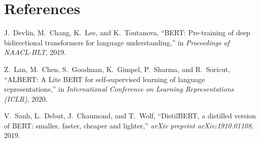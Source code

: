 \documentclass{article}
\begin{document}
\section*{References}

\begin{thebibliography}{1}

J.~Devlin, M.~Chang, K.~Lee, and K.~Toutanova, ``BERT: Pre-training of deep bidirectional transformers for language understanding,'' in \emph{Proceedings of NAACL-HLT}, 2019.

Z.~Lan, M.~Chen, S.~Goodman, K.~Gimpel, P.~Sharma, and R.~Soricut, ``ALBERT: A Lite BERT for self-supervised learning of language representations,'' in \emph{International Conference on Learning Representations (ICLR)}, 2020.

V.~Sanh, L.~Debut, J.~Chaumond, and T.~Wolf, ``DistilBERT, a distilled version of BERT: smaller, faster, cheaper and lighter,'' \emph{arXiv preprint arXiv:1910.01108}, 2019.

\end{thebibliography}
\end{document}

